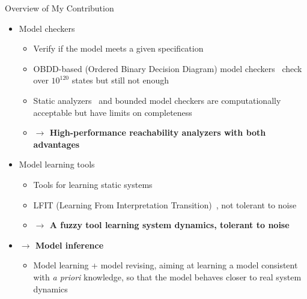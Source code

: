 \documentclass[8pt]{beamer}
\newcommand{\highlight}[1]{\textcolor{blue!50}{\textbf{#1}}}
\begin{document}
\begin{frame}{Overview of My Contribution}
\begin{itemize}
    \item<+-> Model checkers
    \begin{itemize}
        \item<+-> Verify if the model meets a given specification
        \item<+-> OBDD-based (Ordered Binary Decision Diagram) model checkers~\cite{brayton1996vis,cimatti2000nusmv} check over $10^{120}$ states but still not enough
        \item<+-> Static analyzers~\cite{pauleve2012} and bounded model checkers are computationally acceptable but have limits on completeness
        \item<+-> \highlight{$\to$ High-performance reachability analyzers with both advantages}
    \end{itemize}
    \item<+-> Model learning tools
    \begin{itemize}
        \item<+-> Tools for learning static systems~\cite{mochida2018statistical}
        \item<+-> LFIT (Learning From Interpretation Transition)~\cite{ribeiro2018learning}, not tolerant to noise
        \item<+-> \highlight{$\to$ A fuzzy tool learning system dynamics, tolerant to noise}  
    \end{itemize}
    \item<+-> \highlight{$\to$ Model inference}
    \begin{itemize}
        \item<+-> Model learning + model revising, aiming at learning a model consistent with \textit{a priori} knowledge, so that the model behaves closer to real system dynamics
    \end{itemize}
\end{itemize}

\vspace{0.5cm}
\Large
{}
\end{frame}
\end{document}
